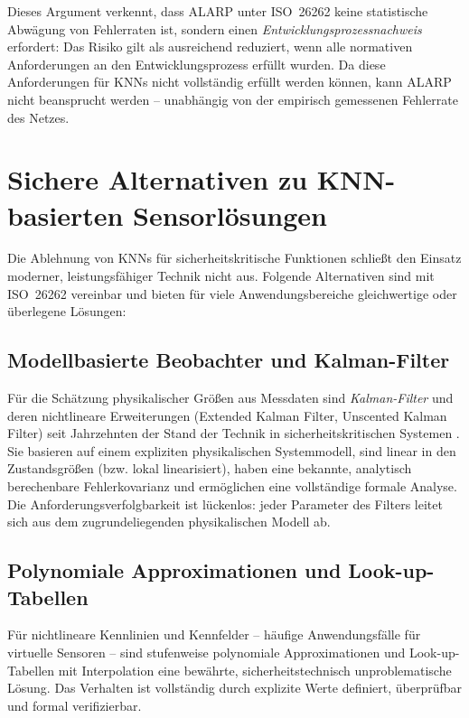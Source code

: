 ﻿\documentclass[12pt,a4paper]{article}
\begin{document}
Dieses Argument verkennt, dass ALARP unter ISO~26262 keine statistische Abw\"agung
von Fehlerraten ist, sondern einen \emph{Entwicklungsprozessnachweis} erfordert:
Das Risiko gilt als ausreichend reduziert, wenn alle normativen Anforderungen an
den Entwicklungsprozess erf\"ullt wurden. Da diese Anforderungen f\"ur KNNs nicht
vollst\"andig erf\"ullt werden k\"onnen, kann ALARP nicht beansprucht werden --
unabh\"angig von der empirisch gemessenen Fehlerrate des Netzes.

\section{Sichere Alternativen zu KNN-basierten Sensorl\"osungen}
\label{sec:alternativen}

Die Ablehnung von KNNs f\"ur sicherheitskritische Funktionen schlie\ss{}t den
Einsatz moderner, leistungsf\"ahiger Technik nicht aus. Folgende Alternativen sind
mit ISO~26262 vereinbar und bieten f\"ur viele Anwendungsbereiche gleichwertige
oder \"uberlegene L\"osungen:

\subsection{Modellbasierte Beobachter und Kalman-Filter}
\label{subsec:alt_kalman}

F\"ur die Sch\"atzung physikalischer Gr\"o\ss{}en aus Messdaten sind
\emph{Kalman-Filter} und deren nichtlineare Erweiterungen (Extended Kalman Filter,
Unscented Kalman Filter) seit Jahrzehnten der Stand der Technik in
sicherheitskritischen Systemen \cite{Leveson2011}. Sie basieren auf einem expliziten
physikalischen Systemmodell, sind linear in den Zustandsgr\"o\ss{}en (bzw. lokal
linearisiert), haben eine bekannte, analytisch berechenbare Fehlerkovarianz und
erm\"oglichen eine vollst\"andige formale Analyse. Die Anforderungsverfolgbarkeit
ist l\"uckenlos: jeder Parameter des Filters leitet sich aus dem zugrundeliegenden
physikalischen Modell ab.

\subsection{Polynomiale Approximationen und Look-up-Tabellen}
\label{subsec:alt_lut}

F\"ur nichtlineare Kennlinien und Kennfelder -- h\"aufige Anwendungsf\"alle f\"ur
virtuelle Sensoren -- sind stufenweise polynomiale Approximationen und
Look-up-Tabellen mit Interpolation eine bew\"ahrte, sicherheitstechnisch
unproblematische L\"osung. Das Verhalten ist vollst\"andig durch explizite Werte
definiert, \"uberpr\"ufbar und formal verifizierbar.
\end{document}
